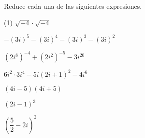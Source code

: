\documentclass[]{srs}
\begin{document}
Reduce cada una de las siguientes expresiones.
\begin{preguntas}(1)
  \pregunta $\sqrt{-4}\cdot\sqrt{-4}$
  \begin{malla}[height=8cm]
  \end{malla}
  \pregunta $-\left(3i\right)^5 -\left(3i\right)^4 -\left(3i\right)^3 -\left(3i\right)^2$
  \begin{malla}[height=8cm]
  \end{malla}
  \pregunta $\left(2i^8\right)^{-4} + \left(2i^2\right)^{-5} - 3i^{20}$
  \begin{malla}[height=8cm]
  \end{malla}
  \pregunta $6i^2\cdot 3i^4 -5i\left(2i+1\right)^2 - 4i^6$
  \begin{malla}[height=8cm]
  \end{malla}
  \pregunta $\left(4i-5\right)\left(4i+5\right)$
  \begin{malla}[height=8cm]
  \end{malla}
  \pregunta $(2i-1)^3$
  \begin{malla}[height=8cm]
  \end{malla}
  \pregunta $\left(\dfrac{5}{2} - 2i\right)^2$
  \begin{malla}[height=8cm]
  \end{malla}
\end{preguntas}
\end{document}
